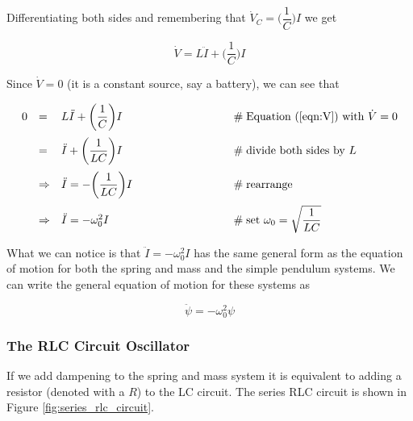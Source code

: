 \documentclass{article}
\theoremstyle{definition}
\begin{document}
\medskip
\noindent
Differentiating both sides and remembering that 
$\dot{V}_{C} = \bigg (\dfrac{1}{C} \bigg ) I$ 
we get

\bigskip
\begin{equation}
\dot{V} = L \ddot{I} + \bigg (\dfrac{1}{C} \bigg ) I
\label{eqn:V}
\end{equation}

\medskip
\noindent
Since $\dot{V} = 0$ (it is a constant source, say a battery),
we can see that

\smallskip
\begin{equation*}
\begin{array}{llll}
0
&=& L \ddot{I} + \bigg (\dfrac{1}{C} \bigg ) I			
		&\hspace{8em} \mathrel{\#} \text{Equation (\ref{eqn:V}) with $\dot{V} = 0$} \\
[12pt]
&=& \ddot{I} + \bigg (\dfrac{1}{LC} \bigg ) I			
		&\hspace{8em} \mathrel{\#} \text{divide both sides by $L$} \\	
[12pt]
&\Rightarrow& \ddot{I} = - \bigg (\dfrac{1}{LC} \bigg ) I       
		&\hspace{8em} \mathrel{\#} \text{rearrange}	\\	
[12pt]
&\Rightarrow& \ddot{I} = - \omega_{0}^{2} I			
		&\hspace{8em} \mathrel{\#} \text{set $\omega_{0} = \sqrt{\dfrac{1}{LC}}$}
\end{array}
\end{equation*}

\smallskip
\noindent
What we can notice is that $\ddot{I} = - \omega_{0}^{2} I$ 
has the same general form as the equation of motion for both the 
spring and mass and the simple pendulum systems. We can write the 
general equation of motion for these systems as


\begin{equation}
\ddot{\psi} = - \omega_{0}^{2} \psi
\label{eqn:general_simple_eom}
\end{equation}

\subsubsection{The RLC Circuit Oscillator}
\label{subsubsec:rlc_circuit}
If we add dampening to the spring and mass system it
is equivalent to adding a resistor (denoted with a $R$) 
to the LC circuit. The series RLC circuit is 
shown in Figure \ref{fig:series_rlc_circuit}. 
\end{document}
